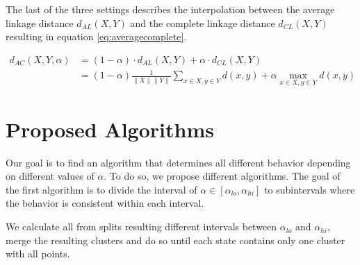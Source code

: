 The last of the three settings describes the interpolation between the average linkage distance $d_{AL}(X,Y)$ and the complete linkage distance $d_{CL}(X,Y)$ resulting in equation \ref{eq:averagecomplete}.

\begin{equation}
    \begin{aligned}
        d_{AC}(X,Y,\alpha) &= (1 - \alpha) \cdot d_{AL}(X,Y) + \alpha \cdot d_{CL}(X,Y)\\
        &= (1 - \alpha) \frac{1}{\|X\| \|Y\|}\sum\limits_{x \in X, y \in Y} d(x,y) + \alpha \max\limits_{x \in X, y \in Y} d(x,y)
    \end{aligned}
    \label{eq:averagecomplete}
\end{equation}


\section{Proposed Algorithms}

Our goal is to find an algorithm that determines all different behavior depending on different values of $\alpha$. To do so, we propose different algorithms. The goal of the first algorithm is to divide the interval of $\alpha \in [\alpha_{lo}, \alpha_{hi}]$ to subintervals where the behavior is consistent within each interval. 

\begin{algorithm}[ht]
    \caption{We calculate all from splits resulting different intervals between $\alpha_{lo}$ and $\alpha_{hi}$, merge the resulting clusters and do so until each state contains only one cluster with all points.}
    \label{alg:alphalinkage1}
\end{algorithm}

